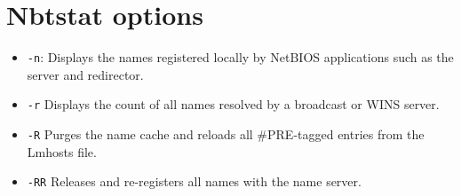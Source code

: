\section{Nbtstat options}

\begin{itemize}
    \item \verb|-n|: Displays the names registered locally by NetBIOS applications such as the server and redirector.
    \item \verb|-r| Displays the count of all names resolved by a broadcast or WINS server.
    \item \verb|-R| Purges the name cache and reloads all #PRE-tagged entries from the Lmhosts file.
    \item \verb|-RR| Releases and re-registers all names with the name server.
\end{itemize}